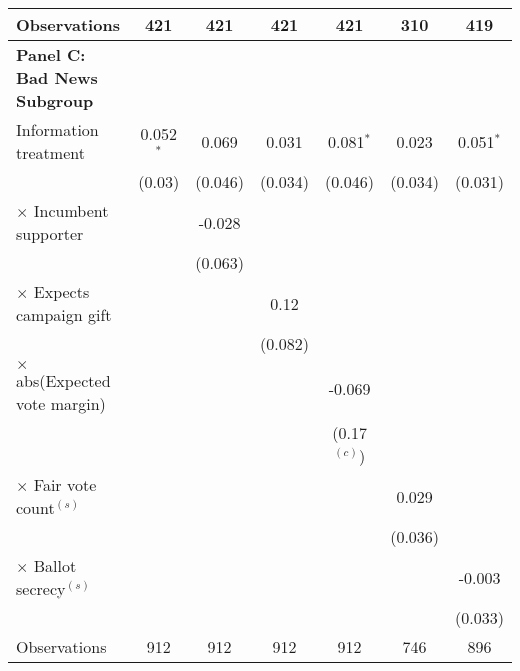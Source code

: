 \begin{center}
\begin{tabular}{l c c c c c c }
    Observations &421&421&421&421&310&419\\
    \hline
    \textbf{Panel C: Bad News Subgroup}\\
    \hline
    Information treatment &0.052$^{*}$&0.069&0.031&0.081$^{*}$&0.023&0.051$^{*}$\\
    &(0.03)&(0.046)&(0.034)&(0.046)&(0.034)&(0.031)\\
    $\times$ Incumbent supporter & &-0.028& & & & \\
    & &(0.063)& & & & \\
    $\times$ Expects campaign gift & & &0.12 & & & \\
    & & &(0.082) & & & \\
    $\times$ abs(Expected vote margin)  & & & &-0.069& & \\
    & & & &(0.17$^{(c)}$)& & \\
    $\times$ Fair vote count$^{(s)}$ & & & & &0.029& \\
    & & & & &(0.036)& \\
    $\times$ Ballot secrecy$^{(s)}$ & & & & & &-0.003\\
    & & & & & &(0.033)\\
    Observations &912&912&912&912&746&896\\
    \hline\hline
    \end{tabular}
    \end{center}
